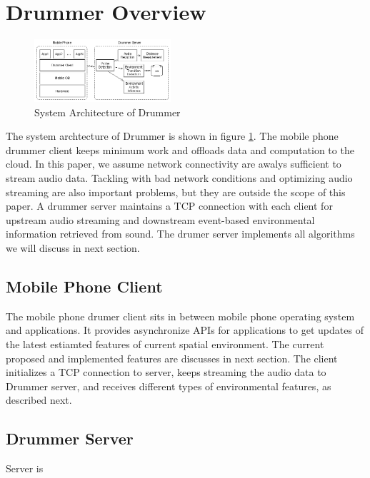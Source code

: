 \section{Drummer Overview}
\label{sec:overview}


\begin{figure}[H]
\centering
\includegraphics[width=0.45\textwidth]{./fig/arch.eps}
\caption{System Architecture of Drummer }
\label{fig:arch}
\end{figure}


The system archtecture of Drummer is shown in figure \ref{fig:arch}. The mobile phone drummer 
client keeps minimum work and offloads data and computation to the cloud. In this paper, we assume 
network connectivity are awalys sufficient to stream audio data. Tackling with bad network conditions 
\cite{cuervo2010maui} and optimizing audio streaming \cite{farleycsense} are also important 
problems, but they are outside the scope of this paper. A drummer server maintains a TCP connection
with each client for upstream audio streaming and downstream event-based environmental information
retrieved from sound. The drumer server implements all algorithms we will discuss in next section.


\subsection{Mobile Phone Client}

The mobile phone drumer client sits in between mobile phone operating system and applications.
It provides asynchronize APIs for applications to get updates of the latest estiamted features of
current spatial environment. The current proposed and implemented features are discusses in next section.
The client initializes a TCP connection to server, keeps streaming the audio data to Drummer server, 
and receives different types of environmental features, as described next.



\subsection{Drummer Server}

Server is 